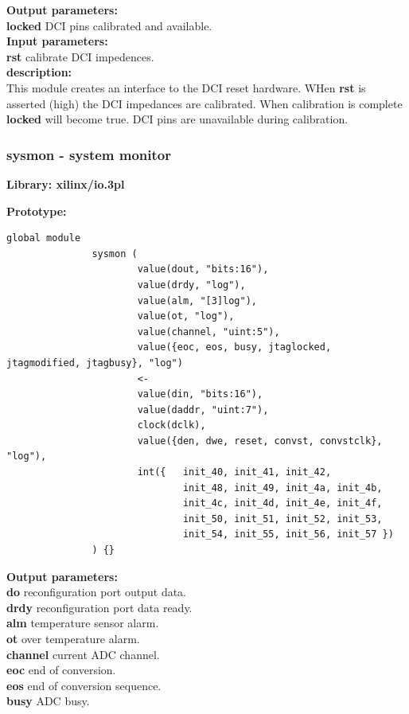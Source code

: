             {\bf Output parameters:} \\
            {\bf locked} DCI pins calibrated and available.\\


            {\bf Input parameters:} \\
            {\bf rst} calibrate DCI impedences.\\

            {\bf description:} \\
            This module creates an interface to the DCI reset hardware.
            WHen {\bf rst} is asserted (high) the DCI impedances are
            calibrated. When calibration is complete {\bf locked} will become
            true. DCI pins are unavailable during calibration.


        \subsubsection{sysmon - system monitor}\label{sec:lmsysmon}

            {\bf Library: xilinx/io.3pl}

            {\bf Prototype:} \\
            \vsp
            \begin{lstlisting}[gobble=12, language=threepl]
               global module
               sysmon (
                       value(dout, "bits:16"),
                       value(drdy, "log"),
                       value(alm, "[3]log"),
                       value(ot, "log"),
                       value(channel, "uint:5"),
                       value({eoc, eos, busy, jtaglocked, jtagmodified, jtagbusy}, "log")
                       <-
                       value(din, "bits:16"),
                       value(daddr, "uint:7"),
                       clock(dclk),
                       value({den, dwe, reset, convst, convstclk}, "log"),
                       int({   init_40, init_41, init_42,
                               init_48, init_49, init_4a, init_4b,
                               init_4c, init_4d, init_4e, init_4f,
                               init_50, init_51, init_52, init_53,
                               init_54, init_55, init_56, init_57 })
               ) {}
            \end{lstlisting}

            {\bf Output parameters:} \\
            {\bf do} reconfiguration port output data.\\
            {\bf drdy} reconfiguration port data ready.\\
            {\bf alm} temperature sensor alarm.\\
            {\bf ot} over temperature alarm.\\
            {\bf channel} current ADC channel.\\
            {\bf eoc} end of conversion.\\
            {\bf eos} end of conversion sequence.\\
            {\bf busy} ADC busy.\\


